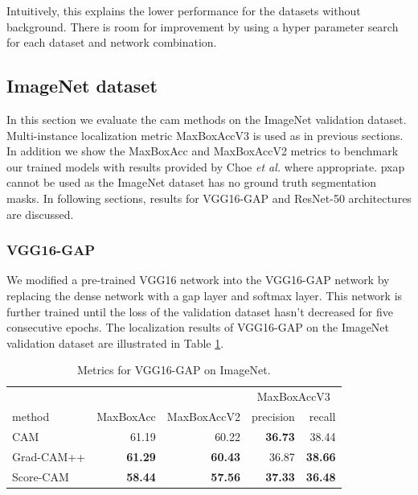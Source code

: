 Intuitively, this explains the lower performance for the datasets without background. There is room for improvement by using a hyper parameter search for each dataset and network combination.

\subsection{ImageNet dataset}
In this section we evaluate the \acrshort{cam} methods on the ImageNet validation dataset. Multi-instance localization metric MaxBoxAccV3 is used as in previous sections. In addition we show the MaxBoxAcc and MaxBoxAccV2 metrics to benchmark our trained models with results provided by Choe \textit{et al.} \cite{choe2020evaluating} where appropriate. \acrfull{pxap} cannot be used as the ImageNet dataset has no ground truth segmentation masks. In following sections, results for VGG16-GAP and ResNet-50 architectures are discussed.

\subsubsection{VGG16-GAP}
We modified a pre-trained VGG16 network into the VGG16-GAP network by replacing the dense network with a \acrshort{gap} layer and softmax layer. This network is further trained until the loss of the validation dataset hasn't decreased for five consecutive epochs. The localization results of VGG16-GAP on the ImageNet validation dataset are illustrated in Table \ref{tab:metrics_vgg16_gap_imagenet}.

\begin{table}[ht]
\centering
\begin{tabular}{lrrrr}
\toprule
 & & & \multicolumn{2}{c}{MaxBoxAccV3} \\
method & MaxBoxAcc & MaxBoxAccV2 & precision & recall \\
\cmidrule(lr){1-1} \cmidrule(lr){2-5}
CAM & 61.19 & 60.22 & \color{purple} \bfseries 36.73 & 38.44 \\
Grad-CAM++ & \color{teal} \bfseries 61.29 & \color{teal} \bfseries 60.43 & 36.87 & \color{teal} \bfseries 38.66 \\
Score-CAM & \color{purple} \bfseries 58.44 & \color{purple} \bfseries 57.56 & \color{teal} \bfseries 37.33 & \color{purple} \bfseries 36.48 \\
\bottomrule
\end{tabular}
\caption[Metrics for VGG16-GAP on ImageNet]{Metrics for VGG16-GAP on ImageNet.}
\label{tab:metrics_vgg16_gap_imagenet}
\end{table}

